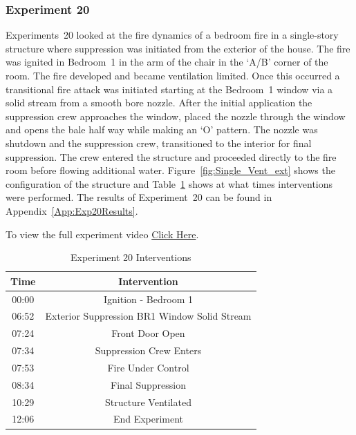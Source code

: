\documentclass[12pt,oneside]{book}
\begin{document}
\FloatBarrier
\clearpage

\subsubsection{Experiment 20}
Experiments~20 looked at the fire dynamics of a bedroom fire in a single-story structure where suppression was initiated from the exterior of the house. The fire was ignited in Bedroom~1 in the arm of the chair in the `A/B' corner of the room. The fire developed and became ventilation limited. Once this occurred a transitional fire attack was initiated starting at the Bedroom~1 window via a solid stream from a smooth bore nozzle. After the initial application the suppression crew approaches the window, placed the nozzle through the window and opens the bale half way while making an `O' pattern. The nozzle was shutdown and the suppression crew, transitioned to the interior for final suppression. The crew entered the structure and proceeded directly to the fire room before flowing additional water. Figure~\ref{fig:Single_Vent_ext} shows the configuration of the structure and Table~\ref{Table:Exp20Interventions} shows at what times interventions were performed. The results of Experiment~20 can be found in Appendix~\ref{App:Exp20Results}. 

To view the full experiment video \href{https://player.vimeo.com/video/170499620?autoplay=1}{Click Here}.

\begin{table}[H]
	\centering
	\caption{Experiment 20 Interventions}
	\begin{tabular}{|c|c|} 
		\hline
		Time & Intervention \\ \hline \hline
		00:00 & Ignition - Bedroom 1 \\ \hline
		06:52 & Exterior Suppression BR1 Window Solid Stream \\ \hline
		07:24 & Front Door Open \\ \hline
		07:34 & Suppression Crew Enters\\ \hline
		07:53 & Fire Under Control \\ \hline
		08:34 & Final Suppression \\ \hline 
		10:29 & Structure Ventilated \\ \hline
		12:06 & End Experiment\\ \hline
	\end{tabular}
	\label{Table:Exp20Interventions}
\end{table}

\FloatBarrier
\clearpage
\end{document}
